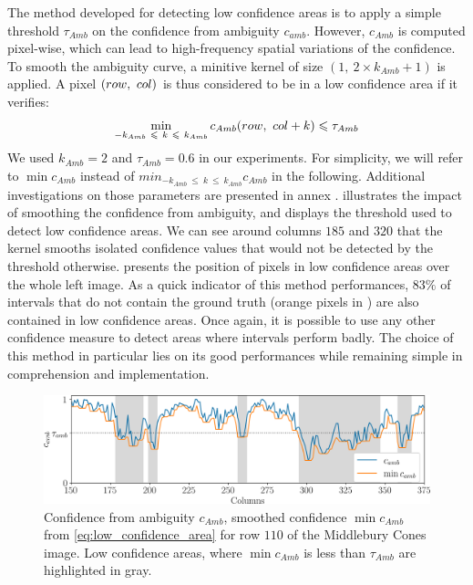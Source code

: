 The method developed for detecting low confidence areas is to apply a simple threshold $\tau_{Amb}$ on the confidence from ambiguity $c_{amb}$.  However, $c_{Amb}$ is computed pixel-wise, which can lead to high-frequency spatial variations of the confidence. To smooth the ambiguity curve, a minitive kernel of size $(1, ~2\times k_{Amb}+1)$ is applied. A pixel $(row, ~col)$ is thus considered to be in a low confidence area if it verifies:
\begin{align}\label{eq:low_confidence_area}
    \min_{-k_{Amb}~\leqslant~ k~\leqslant ~k_{Amb}}c_{Amb}(row, ~col+k)\leqslant \tau_{Amb}
\end{align}
We used $k_{Amb}=2$ and $\tau_{Amb}=0.6$ in our experiments. For simplicity, we will refer to $\min c_{Amb}$ instead of $min_{-k_{Amb}~\leqslant~ k~\leqslant ~k_{Amb}}c_{Amb}$ in the following. Additional investigations on those parameters are presented in annex .  illustrates the impact of smoothing the confidence from ambiguity, and displays the threshold used to detect low confidence areas. We can see around columns $185$ and $320$ that the kernel smooths isolated confidence values that would not be detected by the threshold otherwise.  presents the position of pixels in low confidence areas over the whole left image. As a quick indicator of this method performances, $83\%$ of intervals that do not contain the ground truth (orange pixels in ) are also contained in low confidence areas. Once again, it is possible to use any other confidence measure to detect areas where intervals perform badly. The choice of this method in particular lies on its good performances while remaining simple in comprehension and implementation.

\begin{figure}
    \centering
    \includegraphics[width=\linewidth]{Images/Chap_5/ambiguity_kernel_row_110.png}
    \caption{Confidence from ambiguity $c_{Amb}$, smoothed confidence $\min c_{Amb}$ from \eqref{eq:low_confidence_area} for row $110$ of the Middlebury Cones image. Low confidence areas, where $\min c_{Amb}$ is less than $\tau_{Amb}$ are highlighted in gray.}
    \label{fig:ambiguity_kernel}
\end{figure}

